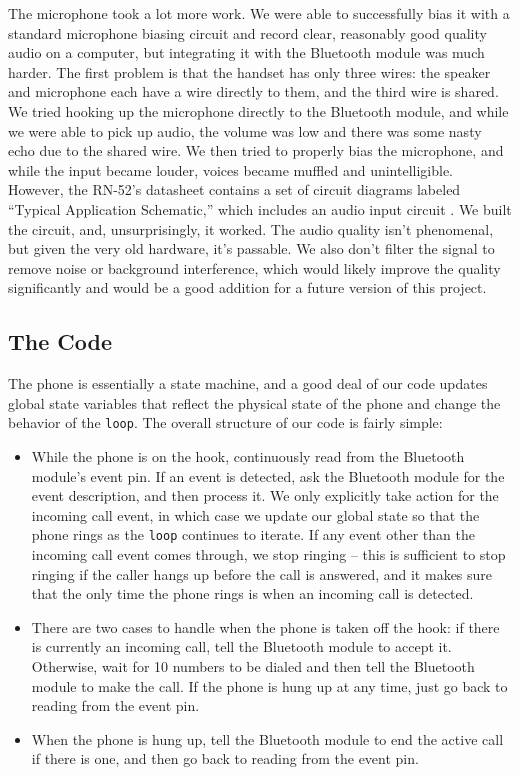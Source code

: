 \documentclass{es50report}
\begin{document}
    The microphone took a lot more work. We were able to successfully bias it with a standard microphone biasing circuit and record clear, reasonably good quality audio on a computer, but integrating it with the Bluetooth module was much harder. The first problem is that the handset has only three wires: the speaker and microphone each have a wire directly to them, and the third wire is shared. We tried hooking up the microphone directly to the Bluetooth module, and while we were able to pick up audio, the volume was low and there was some nasty echo due to the shared wire. We then tried to properly bias the microphone, and while the input became louder, voices became muffled and unintelligible. However, the RN-52's datasheet contains a set of circuit diagrams labeled ``Typical Application Schematic,'' which includes an audio input circuit \cite{rn52Datasheet}. We built the circuit, and, unsurprisingly, it worked. The audio quality isn't phenomenal, but given the very old hardware, it's passable. We also don't filter the signal to remove noise or background interference, which would likely improve the quality significantly and would be a good addition for a future version of this project.

    \subsection{The Code}
    The phone is essentially a state machine, and a good deal of our code updates global state variables that reflect the physical state of the phone and change the behavior of the \verb+loop+. The overall structure of our code is fairly simple:
    \begin{itemize}
        \item While the phone is on the hook, continuously read from the Bluetooth module's event pin. If an event is detected, ask the Bluetooth module for the event description, and then process it. We only explicitly take action for the incoming call event, in which case we update our global state so that the phone rings as the \verb+loop+ continues to iterate. If any event other than the incoming call event comes through, we stop ringing -- this is sufficient to stop ringing if the caller hangs up before the call is answered, and it makes sure that the only time the phone rings is when an incoming call is detected.
        \item There are two cases to handle when the phone is taken off the hook: if there is currently an incoming call, tell the Bluetooth module to accept it. Otherwise, wait for 10 numbers to be dialed and then tell the Bluetooth module to make the call. If the phone is hung up at any time, just go back to reading from the event pin.
        \item When the phone is hung up, tell the Bluetooth module to end the active call if there is one, and then go back to reading from the event pin.
    \end{itemize}
\end{document}
